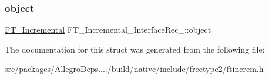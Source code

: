 \mbox{\label{struct_f_t___incremental___interface_rec___ae4f527f53465ff84ad01b484fe721a88}} 
\subsubsection{\texorpdfstring{object}{object}}
{\footnotesize\ttfamily \hyperlink{ftincrem_8h_a2ec8ac9cacdca1f493e4c3c5d27ed3c4}{F\+T\+\_\+\+Incremental} F\+T\+\_\+\+Incremental\+\_\+\+Interface\+Rec\+\_\+\+::object}



The documentation for this struct was generated from the following file\+:\begin{DoxyCompactItemize}
\item 
src/packages/\+Allegro\+Deps..../build/native/include/freetype2/\hyperlink{ftincrem_8h}{ftincrem.\+h}\end{DoxyCompactItemize}
